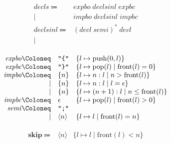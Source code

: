 \documentclass[12pt]{article}
\begin{document}
\pagestyle{empty}

\begin{align*}
    \begin{array}{rl}
        \mathit{decls}
        \Coloneq & \mathit{expbo}\; \mathit{declsinl}\; \mathit{expbc} \\
        \mid &\mathit{impbo}\; \mathit{declsinl}\; \mathit{impbc} \\
        \mathit{declsinl}
        \Coloneq &(\mathit{decl}\; \mathit{semi})^*\; \mathit{decl} \\
        \mid
    \end{array}
\end{align*}

\begin{align*}
    \begin{array}{rll}
        \mathit{expbo}
        \Coloneq &\texttt{\textquotedbl\{\textquotedbl} &\{l \mapsto \mathrm{push}(0, l)\} \\
        \mathit{expbc}
        \Coloneq &\texttt{\textquotedbl\}\textquotedbl} &\{l \mapsto \mathrm{pop}(l) \mid \mathrm{front}(l) = 0\} \\
        \mathit{impbo}
        \Coloneq &\{n\} &\{l \mapsto n:l \mid n > \mathrm{front}(l)\} \\
        \mid &\{n\} &\{l \mapsto n:l \mid l = \epsilon\} \\
        \mid &\{n\} &\{l \mapsto (n + 1):l \mid n \leq \mathrm{front}(l)\} \\
        \mathit{impbc}
        \Coloneq &\epsilon &\{l \mapsto \mathrm{pop}(l) \mid \mathrm{front}(l) > 0\} \\
        \mathit{semi}
        \Coloneq &\texttt{\textquotedbl;\textquotedbl} \\
        \mid &\langle n\rangle &\{l \mapsto l \mid \mathrm{front}(l) = n\}
    \end{array}
\end{align*}

\begin{align*}
    \begin{array}{rll}
        \mathbf{skip} \Coloneq &\langle n\rangle &\{l \mapsto l \mid \mathrm{front}(l) < n\}
    \end{array}
\end{align*}
\end{document}
